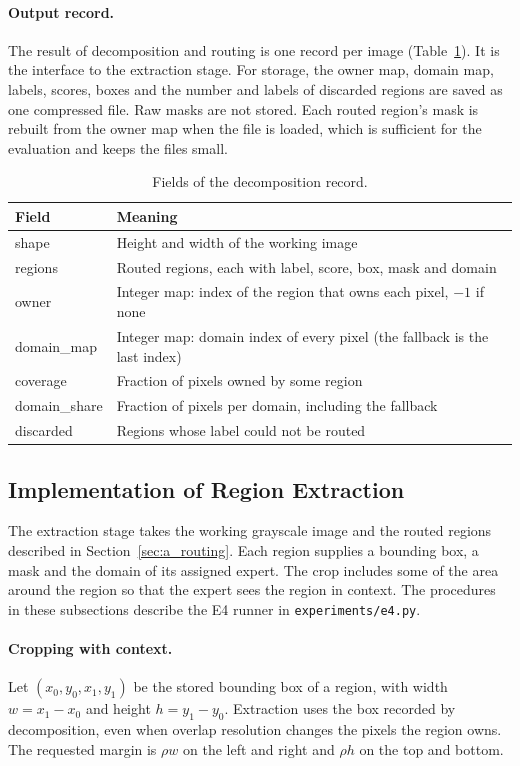 \documentclass{FastFyp}
\begin{document}
\paragraph{Output record.} The result of decomposition and routing is one record per image (Table~\ref{tab:a_record}). It is the interface to the extraction stage. For storage, the owner map, domain map, labels, scores, boxes and the number and labels of discarded regions are saved as one compressed file. Raw masks are not stored. Each routed region's mask is rebuilt from the owner map when the file is loaded, which is sufficient for the evaluation and keeps the files small.
 
\begin{table}[!ht]
\centering
\caption{Fields of the decomposition record.}
\label{tab:a_record}
\begin{tabular}{|l|p{9cm}|}
\hline
\textbf{Field} & \textbf{Meaning} \\ \hline
shape & Height and width of the working image \\ \hline
regions & Routed regions, each with label, score, box, mask and domain \\ \hline
owner & Integer map: index of the region that owns each pixel, $-1$ if none \\ \hline
domain\_map & Integer map: domain index of every pixel (the fallback is the last index) \\ \hline
coverage & Fraction of pixels owned by some region \\ \hline
domain\_share & Fraction of pixels per domain, including the fallback \\ \hline
discarded & Regions whose label could not be routed \\ \hline
\end{tabular}
\end{table}

\subsection{Implementation of Region Extraction}
\label{sec:b_extraction}
The extraction stage takes the working grayscale image and the routed regions
described in Section~\ref{sec:a_routing}. Each region supplies a bounding box, a
mask and the domain of its assigned expert. The crop includes some of the area
around the region so that the expert sees the region in context. The procedures
in these subsections describe the E4 runner in \texttt{experiments/e4.py}.

\paragraph{Cropping with context.} Let $(x_0,y_0,x_1,y_1)$ be the stored bounding
box of a region, with width $w=x_1-x_0$ and height $h=y_1-y_0$. Extraction uses
the box recorded by decomposition, even when overlap resolution changes the
pixels the region owns. The requested margin is $\rho w$ on the left and right
and $\rho h$ on the top and bottom.
\end{document}
